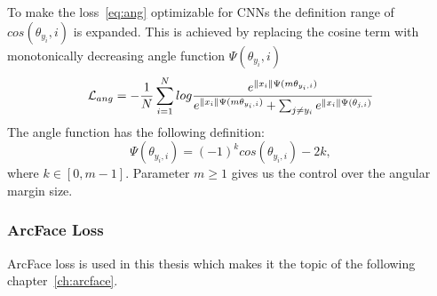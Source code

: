 To make the loss~\ref{eq:ang} optimizable for CNNs the definition range of $cos(\theta_{y_i},i)$ is expanded.
This is achieved by replacing the cosine term with monotonically decreasing angle function $\Psi(\theta_{y_i},i)$
\begin{equation}
    \mathcal{L}_{ang} = -\frac{1}{N} \sum_{i=1}^{N} log \frac{e^{\left\lVert x_i\right\rVert \Psi(m\theta_{y_i,i})}}
    {e^{\left\lVert x_i\right\rVert \Psi(m\theta_{y_i,i})} + \sum_{j \neq y_i} e^{\left\lVert x_{i}\right\rVert \Psi(\theta_{j,i})}}
\end{equation}
The angle function has the following definition:
\begin{equation}
    \Psi(\theta_{y_i,i}) = (-1)^{k} cos(\theta_{y_{i},i}) -2k,
\end{equation}
where $k \in \left[ 0, m-1 \right]$.
Parameter $m \geq 1$ gives us the control over the angular margin size.


\subsubsection{ArcFace Loss}\label{subsubsec:arcface}
ArcFace loss is used in this thesis which makes it the topic of the following chapter~\ref{ch:arcface}.